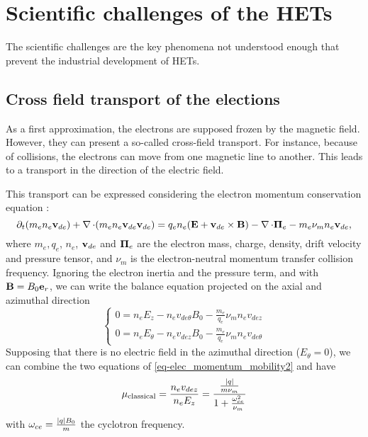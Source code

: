 
\section*{Scientific challenges of the HETs}

The scientific challenges are the key phenomena not understood enough that prevent the industrial development of \ac{HET}s.

\subsection*{Cross field transport of the elections}

  \label{sec-mob}
  As a first approximation, the electrons are supposed frozen by the magnetic field.
  However, they can present a so-called cross-field transport.
  For instance, because of collisions, the electrons can move from one magnetic line to another.
  This leads to a transport in the direction of the electric field.
  
  This transport can be expressed considering the electron momentum conservation equation \citep{lafleur2016a}\string:
  \begin{equation} \label{eq-elec_momentum_mobility}
    \partial_t(m_e n_e {\mathbf v}_{de}) + \operatorname{{\mathbf \nabla}} \cdot (m_e n_e  {\mathbf v}_{de} {\mathbf v}_{de}) = q_e n_e ( {\mathbf E} + {\mathbf v}_{de} \times {\mathbf B}) - \operatorname{{\mathbf \nabla}} \cdot {\mathbf \Pi}_e - m_e \nu_m n_e {\mathbf v}_{de},
  \end{equation}
  where $m_e, q_e$, $n_e$, ${\mathbf v}_{de}$ and ${\mathbf \Pi}_e $ are the electron mass, charge, density, drift velocity and pressure tensor, and $\nu_m$ is the electron-neutral momentum transfer collision frequency.
  Ignoring the electron inertia and the pressure term, and with ${\mathbf B} = B_0 {\mathbf e}_r$, we can write the balance equation projected on the axial and azimuthal direction
  \begin{equation} \label{eq-elec_momentum_mobility2}
  \begin{cases}
    0 =  n_e E_z - n_e v_{de{\theta}} B_0 - \frac{m_e}{q_e} \nu_m n_e v_{dez}\\
    0 =  n_e E_{\theta} -  n_e v_{dez} B_0 - \frac{m_e}{q_e} \nu_m n_e v_{de{\theta}}
  \end{cases}
  \end{equation}
  Supposing that there is no electric field in the azimuthal direction ($E_{\theta}=0$),  we can combine the two equations of \cref{eq-elec_momentum_mobility2} and have \citep{chen2006,meezan2001}
  \begin{equation} \label{eq-mobility}
    \mu_{\mathrm{classical}} = \frac{n_e v_{dez}}{n_e E_z} = \frac{ \frac{\lvert q\rvert}{m \nu_m}}{1 + \frac{\omega_{ce}^2}{\nu_m}}
  \end{equation}
  with $\omega_{ce}= \frac{\lvert q\rvert B_0}{m}$ the cyclotron frequency.
  
